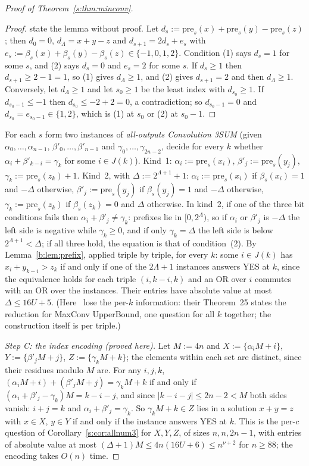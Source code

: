 \documentclass[11pt]{article}
\theoremstyle{definition}
\theoremstyle{remark}
\begin{document}
\begin{proof}[Proof of Theorem~\ref{s:thm:minconv}]
\begin{proof}
\cite{CMWW19} state the lemma without proof. Let $d_s:=\mathrm{pre}_s(x)+\mathrm{pre}_s(y)-\mathrm{pre}_s(z)$; then $d_0=0$, $d_\Lambda=x+y-z$ and $d_{s+1}=2d_s+e_s$ with $e_s:=\beta_s(x)+\beta_s(y)-\beta_s(z)\in\{-1,0,1,2\}$. Condition (1) says $d_s=1$ for some $s$, and (2) says $d_s=0$ and $e_s=2$ for some $s$. If $d_s\ge1$ then $d_{s+1}\ge2-1=1$, so (1) gives $d_\Lambda\ge1$, and (2) gives $d_{s+1}=2$ and then $d_\Lambda\ge1$. Conversely, let $d_\Lambda\ge1$ and let $s_0\ge1$ be the least index with $d_{s_0}\ge1$. If $d_{s_0-1}\le-1$ then $d_{s_0}\le-2+2=0$, a contradiction; so $d_{s_0-1}=0$ and $d_{s_0}=e_{s_0-1}\in\{1,2\}$, which is (1) at $s_0$ or (2) at $s_0-1$.
\end{proof}

For each $s$ form two instances of \emph{all-outputs Convolution 3SUM} (given $\alpha_0,\dots,\alpha_{n-1}$, $\beta'_0,\dots,\beta'_{n-1}$ and $\gamma_0,\dots,\gamma_{2n-2}$, decide for every $k$ whether $\alpha_i+\beta'_{k-i}=\gamma_k$ for some $i\in J(k)$). Kind~1: $\alpha_i:=\mathrm{pre}_s(x_i)$, $\beta'_j:=\mathrm{pre}_s(y_j)$, $\gamma_k:=\mathrm{pre}_s(z_k)+1$. Kind~2, with $\Delta:=2^{\Lambda+1}+1$: $\alpha_i:=\mathrm{pre}_s(x_i)$ if $\beta_s(x_i)=1$ and $-\Delta$ otherwise, $\beta'_j:=\mathrm{pre}_s(y_j)$ if $\beta_s(y_j)=1$ and $-\Delta$ otherwise, $\gamma_k:=\mathrm{pre}_s(z_k)$ if $\beta_s(z_k)=0$ and $\Delta$ otherwise. In kind~2, if one of the three bit conditions fails then $\alpha_i+\beta'_j\ne\gamma_k$: prefixes lie in $[0,2^\Lambda)$, so if $\alpha_i$ or $\beta'_j$ is $-\Delta$ the left side is negative while $\gamma_k\ge0$, and if only $\gamma_k=\Delta$ the left side is below $2^{\Lambda+1}<\Delta$; if all three hold, the equation is that of condition~(2). By Lemma~\ref{b:lem:prefix}, applied triple by triple, for every $k$: some $i\in J(k)$ has $x_i+y_{k-i}>z_k$ if and only if one of the $2\Lambda+1$ instances answers YES at $k$, since the equivalence holds for each triple $(i,k-i,k)$ and an OR over $i$ commutes with an OR over the instances. Their entries have absolute value at most $\Delta\le16U+5$. (Here~\cite{CMWW19} lose the per-$k$ information: their Theorem~25 states the reduction for MaxConv UpperBound, one question for all $k$ together; the construction itself is per triple.)

\emph{Step C: the index encoding (proved here).} Let $M:=4n$ and $X:=\{\alpha_iM+i\}$, $Y:=\{\beta'_jM+j\}$, $Z:=\{\gamma_kM+k\}$; the elements within each set are distinct, since their residues modulo $M$ are. For any $i,j,k$, $(\alpha_iM+i)+(\beta'_jM+j)=\gamma_kM+k$ if and only if $(\alpha_i+\beta'_j-\gamma_k)M=k-i-j$, and since $|k-i-j|\le2n-2<M$ both sides vanish: $i+j=k$ and $\alpha_i+\beta'_j=\gamma_k$. So $\gamma_kM+k\in Z$ lies in a solution $x+y=z$ with $x\in X$, $y\in Y$ if and only if the instance answers YES at $k$. This is the per-$c$ question of Corollary~\ref{s:cor:allnum3} for $X,Y,Z$, of sizes $n,n,2n-1$, with entries of absolute value at most $(\Delta+1)M\le4n(16U+6)\le n^{\nu+2}$ for $n\ge88$; the encoding takes $O(n)$ time.


\end{proof}
\end{document}
